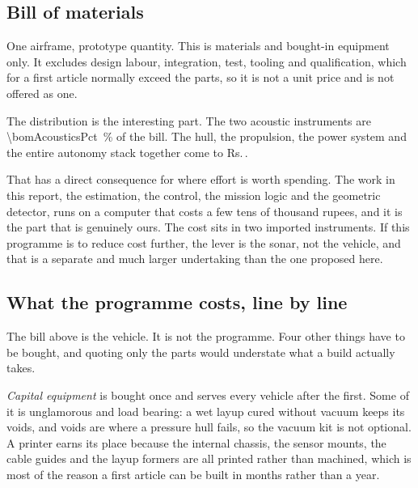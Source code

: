\documentclass[10pt,a4paper]{article}
\newcommand{\INR}[1]{Rs.\,#1}
\begin{document}
\subsection{Bill of materials}

One airframe, prototype quantity. This is materials and bought-in equipment
only. It excludes design labour, integration, test, tooling and qualification,
which for a first article normally exceed the parts, so it is not a unit price
and is not offered as one.

\begin{table}[htbp]\centering\small
\caption{Bill of materials by subsystem, one airframe. The doppler log is a
published price; the imaging sonar is quotation only and is an estimate
carrying real uncertainty.}\label{tab:bom}

\end{table}

The distribution is the interesting part. The two acoustic instruments are
\SI{\bomAcousticsPct}{\percent} of the bill. The hull, the propulsion, the
power system and the entire autonomy stack together come to
\INR{\bomRest}.

That has a direct consequence for where effort is worth spending. The work in
this report, the estimation, the control, the mission logic and the geometric
detector, runs on a computer that costs a few tens of thousand rupees, and it is the
part that is genuinely ours. The cost sits in two imported instruments. If this
programme is to reduce cost further, the lever is the sonar, not the vehicle,
and that is a separate and much larger undertaking than the one proposed here.

\subsection{What the programme costs, line by line}

The bill above is the vehicle. It is not the programme. Four other things
have to be bought, and quoting only the parts would understate what a build
actually takes.

\emph{Capital equipment} is bought once and serves every vehicle after the
first. Some of it is unglamorous and load bearing: a wet layup cured without
vacuum keeps its voids, and voids are where a pressure hull fails, so the
vacuum kit is not optional. A printer earns its place because the internal
chassis, the sensor mounts, the cable guides and the layup formers are all
printed rather than machined, which is most of the reason a first article can
be built in months rather than a year.
\end{document}
